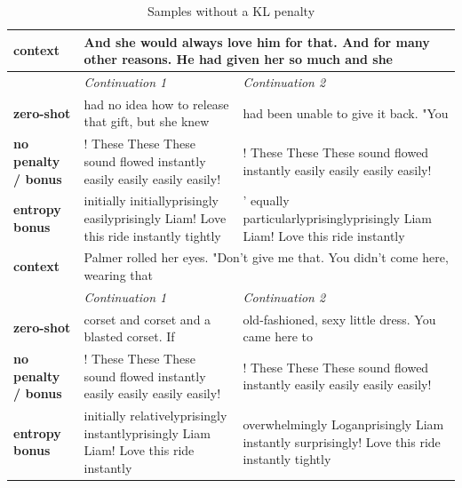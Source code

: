 
\begin{table}[t]
\begin{center}
\caption*{Samples without a KL penalty}
\begin{tabular}{|p{2cm}|p{6cm}|p{6cm}|}

\hline
    
\hline

\textbf{context}
&
\multicolumn{2}{|C{12cm}|}{ 
And she would always love him for that. And for many other reasons. He had given her so much and she
}
\\
\hline
&
\textit{Continuation 1}
&
\textit{Continuation 2}
\\
\hline
\textbf{zero-shot}
&
had no idea how to release that gift, but she knew
&
had been unable to give it back.
\newline\newline
"You
\\
\hline
\textbf{no penalty / bonus}
&
! These These These sound flowed instantly easily easily easily easily!
&
! These These These sound flowed instantly easily easily easily easily!
\\
\hline
\textbf{entropy bonus}
&
initially initiallyprisingly easilyprisingly Liam! Love this ride instantly tightly
&
' equally particularlyprisinglyprisingly Liam Liam! Love this ride instantly
\\
\hline
\hline

\textbf{context}
&
\multicolumn{2}{|C{12cm}|}{ 
Palmer rolled her eyes. "Don't give me that. You didn't come here, wearing that
}
\\
\hline
&
\textit{Continuation 1}
&
\textit{Continuation 2}
\\
\hline
\textbf{zero-shot}
&
corset and corset and a blasted corset. If
&
old-fashioned, sexy little dress. You came here to
\\
\hline
\textbf{no penalty / bonus}
&
! These These These sound flowed instantly easily easily easily easily!
&
! These These These sound flowed instantly easily easily easily easily!
\\
\hline
\textbf{entropy bonus}
&
initially relativelyprisingly instantlyprisingly Liam Liam! Love this ride instantly
&
overwhelmingly Loganprisingly Liam instantly surprisingly! Love this ride instantly tightly
\\
\hline
\hline


\end{tabular}
\end{center}
\end{table}

